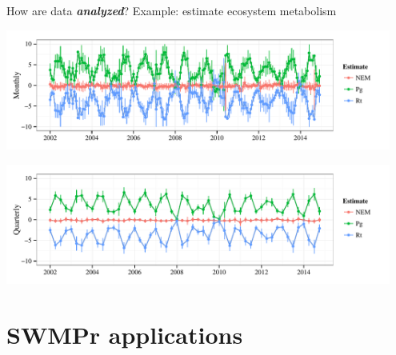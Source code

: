 \documentclass[serif]{beamer}\usepackage[]{graphicx}\usepackage[]{color}
\newenvironment{knitrout}{}{} %
\newcommand{\Bigtxt}[1]{\textbf{\textit{#1}}}
\begin{document}
\begin{frame}[fragile]{How are data \Bigtxt{analyzed}?}
Example: estimate ecosystem metabolism

\begin{knitrout}
\color{fgcolor}

{\centering \includegraphics[width=0.95\textwidth]{fig//ecometab1-1} 

}



\end{knitrout}
\begin{knitrout}
\color{fgcolor}

{\centering \includegraphics[width=0.95\textwidth]{fig//ecometab2-1} 

}



\end{knitrout}
\end{frame}

\section{SWMPr applications}
\end{document}
